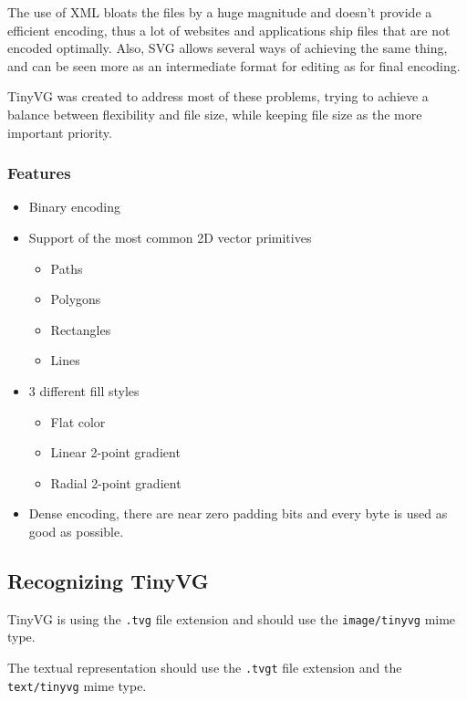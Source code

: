 \documentclass[]{article}
\providecommand{\tightlist}{%
  \setlength{\itemsep}{0pt}\setlength{\parskip}{0pt}}
\begin{document}
The use of XML bloats the files by a huge magnitude and doesn't provide
a efficient encoding, thus a lot of websites and applications ship files
that are not encoded optimally. Also, SVG allows several ways of
achieving the same thing, and can be seen more as an intermediate format
for editing as for final encoding.

TinyVG was created to address most of these problems, trying to achieve a
balance between flexibility and file size, while keeping file size as
the more important priority.

\hypertarget{features}{\subsubsection{Features}\label{features}}

\begin{itemize}
\tightlist
\item Binary encoding
\item
  Support of the most common 2D vector primitives
  \begin{itemize}
  \tightlist
  \item Paths
  \item Polygons
  \item Rectangles
  \item Lines
  \end{itemize}
\item
  3 different fill styles
  \begin{itemize}
  \tightlist
  \item Flat color
  \item Linear 2-point gradient
  \item Radial 2-point gradient
  \end{itemize}
\item Dense encoding, there are near zero padding bits and every byte is used as good as possible.
\end{itemize}

\hypertarget{recognition}{\subsection{Recognizing TinyVG}\label{recognition}}

TinyVG is using the \texttt{.tvg} file extension and should use the \texttt{image/tinyvg} mime type.

The textual representation should use the \texttt{.tvgt} file extension and the \texttt{text/tinyvg} mime type.
\end{document}

